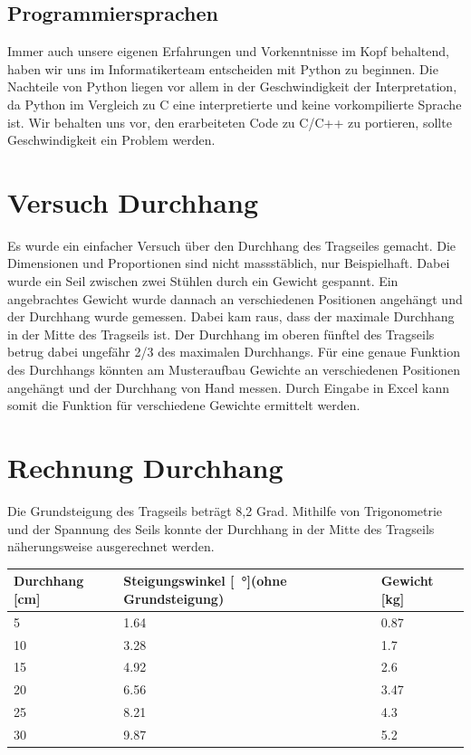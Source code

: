 \documentclass[a4paper]{report}
\begin{document}
\subsection{Programmiersprachen}

Immer auch unsere eigenen Erfahrungen und Vorkenntnisse im Kopf behaltend, haben wir uns im Informatikerteam entscheiden mit Python zu beginnen. Die Nachteile von Python liegen vor allem in der Geschwindigkeit der Interpretation, da Python im Vergleich zu C eine interpretierte und keine vorkompilierte Sprache ist. Wir behalten uns vor, den erarbeiteten Code zu C/C++ zu portieren, sollte Geschwindigkeit ein Problem werden.

\section{Versuch Durchhang}
Es wurde ein einfacher Versuch über den Durchhang des Tragseiles gemacht. Die Dimensionen und Proportionen sind nicht massstäblich, nur Beispielhaft. Dabei wurde ein Seil zwischen zwei Stühlen durch ein Gewicht gespannt. Ein angebrachtes Gewicht wurde dannach an verschiedenen Positionen angehängt und der Durchhang wurde gemessen. Dabei kam raus, dass der maximale Durchhang in der Mitte des Tragseils ist. Der Durchhang im oberen fünftel des Tragseils betrug dabei ungefähr 2/3 des maximalen Durchhangs.
Für eine genaue Funktion des Durchhangs könnten am Musteraufbau Gewichte an verschiedenen Positionen angehängt und der Durchhang von Hand messen. Durch Eingabe in Excel kann somit die Funktion für verschiedene Gewichte ermittelt werden.

\section{Rechnung Durchhang}
Die Grundsteigung des Tragseils beträgt 8,2 Grad. Mithilfe von Trigonometrie und der Spannung des Seils konnte der Durchhang in der Mitte des Tragseils näherungsweise ausgerechnet werden.

\vspace{1em}
\noindent
\begin{tabular}{|p{}|p{}|p{}|}
	\hline
	\textbf{Durchhang [cm]} & \textbf{Steigungswinkel [\SI{}{\degree}](ohne Grundsteigung)} &\textbf{Gewicht [kg]}\\
	\hline
	5&1.64&0.87\\
	\hline
	10&3.28&1.7\\
	\hline
	15&4.92&2.6\\
	\hline
	20&6.56&3.47\\
	\hline
	25&8.21&4.3\\
	\hline
	30&9.87&5.2\\
	\hline
\end{tabular}
\end{document}
